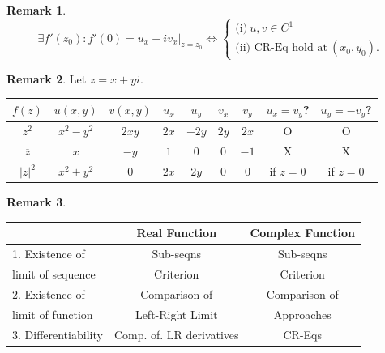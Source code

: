 \documentclass[12pt,openany]{book}
\theoremstyle{definition}
\newtheorem{remark}{Remark}[section]
\newcommand{\abs}[1]{\left\lvert #1 \right\rvert}
\newcommand{\conjugate}[1]{\overline{#1}}
\begin{document}
	\begin{remark}
		\[\exists f'(z_0):f'(0)=u_x+iv_x\bigg|_{z=z_0}\iff\begin{cases}
			\text{(i)}\ u,v\in C^1\\
			\text{(ii) CR-Eq hold at}\ (x_0,y_0).
		\end{cases}\]
	\end{remark}
	\vspace{8pt}
	\begin{remark}
		Let $z=x+yi$. \begin{table}[h!]
			\centering
			\begin{tabular}{@{}c||cc|cc|cc||cc@{}}
				\toprule
				$f(z)$ & $u(x,y)$ & $v(x,y)$ & $u_x$ & $u_y$ & $v_x$ & $v_y$ & $u_x=v_y$? &$u_y=-v_y$?\\
				\midrule
				$z^2$ & $x^2-y^2$ & $2xy$ & $2x$ & $-2y$ & $2y$ & $2x$ & O & O\\
				\addlinespace
				$\conjugate{z}$ & $x$ & $-y$ & $1$ & $0$ & $0$ & $-1$ & X & X\\
				\addlinespace
				$\abs{z}^2$ & $x^2+y^2$ & $0$ & $2x$ & $2y$ & $0$ & $0$ & if $z=0$ & if $z=0$\\
				\bottomrule
			\end{tabular}
		\end{table}
	\end{remark}
	\vspace{8pt}
	\begin{remark}
		\ \begin{table}[h!]
			\centering
			\begin{tabular}{@{}l||c|c@{}}
				\toprule
				& \textbf{Real Function} & \textbf{Complex Function} \\
				\midrule
				1. Existence of & Sub-seqns & Sub-seqns\\
				limit of sequence & Criterion & Criterion \\
				\hline%
				2. Existence of & Comparison of & Comparison of \\
				limit of function & Left-Right Limit & Approaches \\
				\hline%
				3. Differentiability & Comp. of. LR derivatives & CR-Eqs \\
				\bottomrule
			\end{tabular}
		\end{table}
	\end{remark}
	\vspace{8pt}
\end{document}
